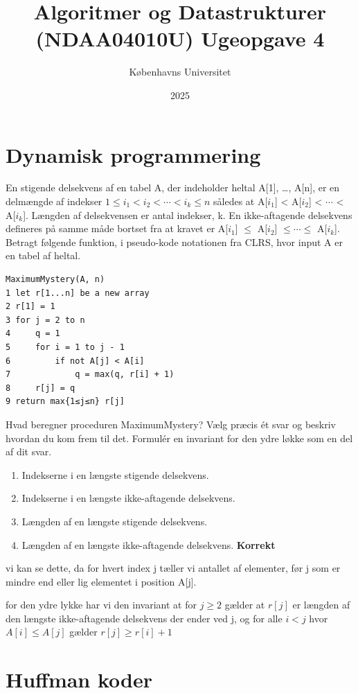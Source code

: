 \documentclass[12pt,a4paper]{article}
\title{Algoritmer og Datastrukturer (NDAA04010U) Ugeopgave 4}
\author{Københavns Universitet}
\date{2025}
\begin{document}
\maketitle

\section{Dynamisk programmering}

En stigende delsekvens af en tabel A, der indeholder heltal A[1], \ldots, A[n], er en delmængde af indekser $1 \leq i_1 < i_2 < \cdots < i_k \leq n$ således at A[$i_1$] < A[$i_2$] < $\cdots$ < A[$i_k$]. Længden af delsekvensen er antal indekser, k. En ikke-aftagende delsekvens defineres på samme måde bortset fra at kravet er A[$i_1$] $\leq$ A[$i_2$] $\leq \cdots \leq$ A[$i_k$]. Betragt følgende funktion, i pseudo-kode notationen fra CLRS, hvor input A er en tabel af heltal.

\begin{verbatim}
MaximumMystery(A, n)
1 let r[1...n] be a new array
2 r[1] = 1
3 for j = 2 to n
4     q = 1
5     for i = 1 to j - 1
6         if not A[j] < A[i]
7             q = max(q, r[i] + 1)
8     r[j] = q
9 return max{1≤j≤n} r[j]
\end{verbatim}

Hvad beregner proceduren MaximumMystery? Vælg præcis ét svar og beskriv hvordan du kom frem til det. Formulér en invariant for den ydre løkke som en del af dit svar.

\begin{enumerate}
\item Indekserne i en længste stigende delsekvens.
\item Indekserne i en længste ikke-aftagende delsekvens.
\item Længden af en længste stigende delsekvens.
\item Længden af en længste ikke-aftagende delsekvens. \textbf{Korrekt}
\end{enumerate}

vi kan se dette, da for hvert index j tæller vi antallet af elementer, før j som er mindre end eller lig elementet i position A[j]. 

for den ydre lykke har vi den invariant at 
for $j \geq 2$ gælder at $r[j]$ er længden af den længste ikke-aftagende delsekvens der ender ved j, og 
for alle $i < j$ hvor $A[i] \leq A[j]$ gælder $r[j] \geq r[i] + 1$

\section{Huffman koder}
\end{document}
